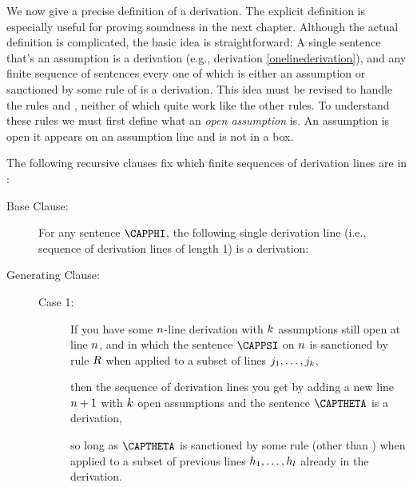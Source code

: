 We now give a precise definition of a derivation. 
The explicit definition is especially useful for proving soundness in the next chapter.
Although the actual definition is complicated, the basic idea is straightforward: 
A single \GSL{} sentence that's an assumption is a derivation (e.g., derivation \ref{onelinederivation}), and any finite sequence of \GSL{} sentences every one of which is either an assumption or sanctioned by some rule of \GSD{} is a derivation. 
This idea must be revised to handle the rules  and , neither of which quite work like the other rules.
To understand these rules we must first define what an \emph{open assumption} is. An assumption is open \Iff it appears on an assumption line and is not in a box.
\begin{majorILnc}{} The following recursive clauses fix which finite sequences of derivation lines are  in \GSD{}:
\begin{description}
\item[Base Clause:] For any \GSL{} sentence $\CAPPHI$, the following single derivation line (i.e., sequence of derivation lines of length 1) is a derivation: 
\begin{gproofnn}
\end{gproofnn}
\item[Generating Clause:] \hfill{}
\begin{description}
\item[Case 1:] If you have some $n$-line derivation with $k$ assumptions still open at line $n$, and in which the sentence $\CAPPSI$ on $n$ is sanctioned by rule $\textsl{R}$ when applied to a subset of lines $j_1,\ldots,j_k$, 
\begin{gproofnn}
\glinend{}{}{}
\glinend{}{$\qquad\vdots$}{}
\glinend{}{}{}
\end{gproofnn}
then the sequence of derivation lines you get by adding a new line $n+1$ with $k$ open assumptions and the sentence $\CAPTHETA$ is a derivation,
\begin{gproofnn}
\glinend{}{}{}
\glinend{}{$\qquad\vdots$}{}
\glinend{}{}{}
\end{gproofnn}
so long as $\CAPTHETA$ is sanctioned by some rule  (other than ) when applied to a subset of previous lines $h_1,\ldots,h_l$ already in the derivation. 


\end{description}
\end{description}
\end{majorILnc}
